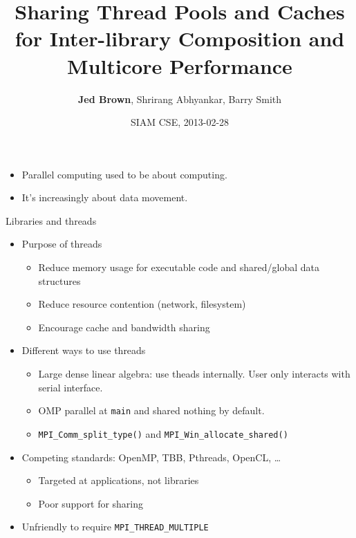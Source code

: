 \documentclass{beamer}
\title{Sharing Thread Pools and Caches for Inter-library Composition and Multicore Performance}
\author{{\bf Jed Brown}, Shrirang Abhyankar, Barry Smith}
\institute
{
  Mathematics and Computer Science Division, Argonne National Laboratory
}
\date{SIAM CSE, 2013-02-28}
\begin{document}
\lstset{language=C}
\normalem

\begin{frame}
  \titlepage
\end{frame}

\begin{frame}
  \begin{itemize} \Large
  \item Parallel computing used to be about computing.
  \item<2> \alert{It's increasingly about data movement.}
  \end{itemize}
\end{frame}

\begin{frame}{Libraries and threads}
  \begin{itemize}
  \item Purpose of threads
    \begin{itemize}
    \item Reduce memory usage for executable code and shared/global data structures
    \item Reduce resource contention (network, filesystem)
    \item Encourage cache and bandwidth sharing
    \end{itemize}
  \item Different ways to use threads
    \begin{itemize}
    \item Large dense linear algebra: use theads internally. User only interacts with serial interface.
    \item OMP parallel at \texttt{main} and shared nothing by default.
    \item \texttt{MPI\_Comm\_split\_type()} and \texttt{MPI\_Win\_allocate\_shared()}
    \end{itemize}
  \item Competing standards: OpenMP, TBB, Pthreads, OpenCL, \ldots
    \begin{itemize}
    \item Targeted at applications, not libraries
    \item Poor support for sharing
    \end{itemize}
  \item Unfriendly to require \texttt{MPI\_THREAD\_MULTIPLE}
  \end{itemize}
\end{frame}
\end{document}
